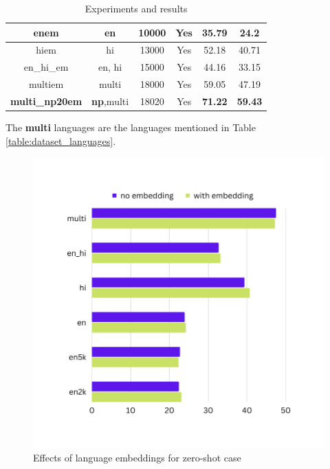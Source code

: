 \begin{table}[ht]
\begin{center}
\begin{tabular}{|c|c|c|c|c|c|}
            \hline
            enem & en & 10000 & Yes & 35.79 & 24.2 \\
            \hline
            hiem & hi & 13000 & Yes & 52.18 & 40.71 \\
            \hline
            en\_hi\_em & en, hi & 15000 & Yes & 44.16 & 33.15 \\
            \hline
            multiem & multi & 18000 & Yes & 59.05 & 47.19 \\
            \hline
            \textbf{multi\_np20em} & \textbf{np},multi & 18020 & Yes & \textbf{71.22} & \textbf{59.43} \\
            \hline
        \end{tabular}
        \caption{Experiments and results}
        \label{table:experiments_results}
    \end{center}
\end{table}
The \textbf{multi} languages are the languages mentioned in Table \ref{table:dataset_languages}.

\begin{figure}[!h]
    \center
    \includegraphics[scale=0.4]{images/results}
    \caption{Effects of language embeddings for zero-shot case}
    \label{results}
\end{figure}

